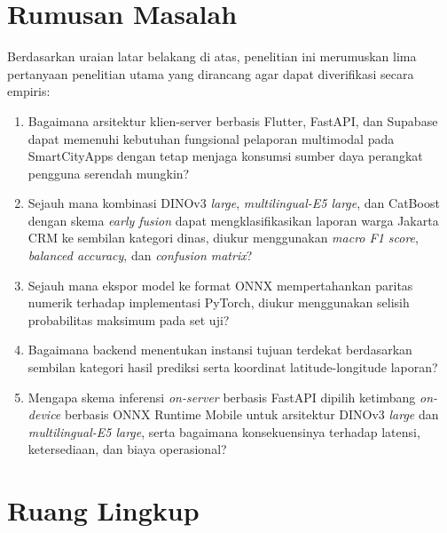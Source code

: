 \section{Rumusan Masalah}

Berdasarkan uraian latar belakang di atas, penelitian ini merumuskan lima pertanyaan penelitian utama yang dirancang agar dapat diverifikasi secara empiris:

\begin{enumerate}
    \item Bagaimana arsitektur klien-server berbasis Flutter, FastAPI, dan Supabase dapat memenuhi kebutuhan fungsional pelaporan multimodal pada SmartCityApps dengan tetap menjaga konsumsi sumber daya perangkat pengguna serendah mungkin?

    \item Sejauh mana kombinasi DINOv3 \textit{large}, \textit{multilingual-E5 large}, dan CatBoost dengan skema \textit{early fusion} dapat mengklasifikasikan laporan warga Jakarta CRM ke sembilan kategori dinas, diukur menggunakan \textit{macro F1 score}, \textit{balanced accuracy}, dan \textit{confusion matrix}?

    \item Sejauh mana ekspor model ke format ONNX mempertahankan paritas numerik terhadap implementasi PyTorch, diukur menggunakan selisih probabilitas maksimum pada set uji?

    \item Bagaimana backend menentukan instansi tujuan terdekat berdasarkan sembilan kategori hasil prediksi serta koordinat latitude-longitude laporan?

    \item Mengapa skema inferensi \textit{on-server} berbasis FastAPI dipilih ketimbang \textit{on-device} berbasis ONNX Runtime Mobile untuk arsitektur DINOv3 \textit{large} dan \textit{multilingual-E5 large}, serta bagaimana konsekuensinya terhadap latensi, ketersediaan, dan biaya operasional?
\end{enumerate}

\section{Ruang Lingkup}


